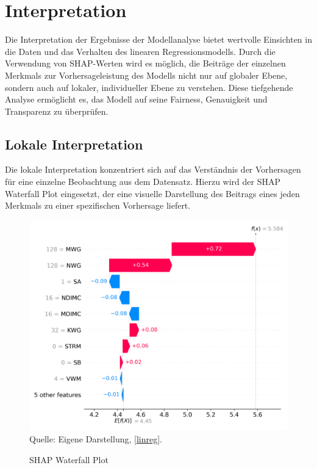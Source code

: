 \section{Interpretation}

Die Interpretation der Ergebnisse der Modellanalyse bietet wertvolle Einsichten in die Daten 
und das Verhalten des linearen Regressionsmodells. Durch die Verwendung von SHAP-Werten wird 
es möglich, die Beiträge der einzelnen Merkmals zur Vorhersageleistung des Modells nicht nur 
auf globaler Ebene, sondern auch auf lokaler, individueller Ebene zu verstehen. 
Diese tiefgehende Analyse ermöglicht es, das Modell auf seine Fairness, 
Genauigkeit und Transparenz zu überprüfen.


\subsection{Lokale Interpretation}

Die lokale Interpretation konzentriert sich auf das Verständnis der Vorhersagen 
für eine einzelne Beobachtung aus dem Datensatz. Hierzu wird der SHAP Waterfall Plot eingesetzt, 
der eine visuelle Darstellung des Beitrags eines jeden Merkmals zu einer spezifischen Vorhersage liefert.

\begin{figure}[!h]
    \caption{SHAP Waterfall Plot}
    \includegraphics[width=1\textwidth]{../scripts/images/shap_waterfall_plot_gpu.png}
    Quelle: Eigene Darstellung, \ref{linreg}.
    \label{pic:shap_waterfall}
\end{figure}


